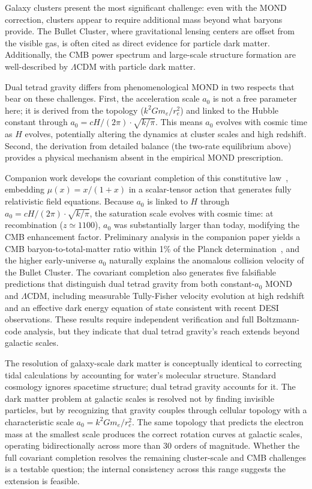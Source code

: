 \documentclass[aps,prd,preprint,superscriptaddress,showpacs,preprintnumbers,amsmath,amssymb,nofootinbib]{revtex4-2}
\begin{document}
Galaxy clusters present the most significant challenge: even with the MOND correction, clusters appear to require additional mass beyond what baryons provide. The Bullet Cluster, where gravitational lensing centers are offset from the visible gas, is often cited as direct evidence for particle dark matter. Additionally, the CMB power spectrum and large-scale structure formation are well-described by $\Lambda$CDM with particle dark matter.

Dual tetrad gravity differs from phenomenological MOND in two respects that bear on these challenges. First, the acceleration scale $a_0$ is not a free parameter here; it is derived from the topology ($k^2 G m_e / r_e^2$) and linked to the Hubble constant through $a_0 = cH/(2\pi) \cdot \sqrt{k/\pi}$. This means $a_0$ evolves with cosmic time as $H$ evolves, potentially altering the dynamics at cluster scales and high redshift. Second, the derivation from detailed balance (the two-rate equilibrium above) provides a physical mechanism absent in the empirical MOND prescription.

Companion work develops the covariant completion of this constitutive law~\cite{paper2}, embedding $\mu(x) = x/(1+x)$ in a scalar-tensor action that generates fully relativistic field equations. Because $a_0$ is linked to $H$ through $a_0 = cH/(2\pi) \cdot \sqrt{k/\pi}$, the saturation scale evolves with cosmic time: at recombination ($z \simeq 1100$), $a_0$ was substantially larger than today, modifying the CMB enhancement factor. Preliminary analysis in the companion paper yields a CMB baryon-to-total-matter ratio within 1\% of the Planck determination~\cite{paper2}, and the higher early-universe $a_0$ naturally explains the anomalous collision velocity of the Bullet Cluster. The covariant completion also generates five falsifiable predictions that distinguish dual tetrad gravity from both constant-$a_0$ MOND and $\Lambda$CDM, including measurable Tully-Fisher velocity evolution at high redshift and an effective dark energy equation of state consistent with recent DESI observations. These results require independent verification and full Boltzmann-code analysis, but they indicate that dual tetrad gravity's reach extends beyond galactic scales.

The resolution of galaxy-scale dark matter is conceptually identical to correcting tidal calculations by accounting for water's molecular structure. Standard cosmology ignores spacetime structure; dual tetrad gravity accounts for it. The dark matter problem at galactic scales is resolved not by finding invisible particles, but by recognizing that gravity couples through cellular topology with a characteristic scale $a_0 = k^2 G m_e / r_e^2$. The same topology that predicts the electron mass at the smallest scale produces the correct rotation curves at galactic scales, operating bidirectionally across more than 30 orders of magnitude. Whether the full covariant completion resolves the remaining cluster-scale and CMB challenges is a testable question; the internal consistency across this range suggests the extension is feasible.
\end{document}
